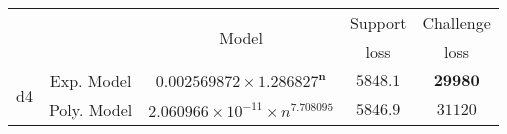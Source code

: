 \begin{tabular}{ccccc} 
\hline 
 &  & \multirow{2}{*}{Model} & Support & Challenge\tabularnewline 
 &  &  & loss  & loss\tabularnewline 
\hline 
\hline 
\multirow{2}{*}{d4} & Exp. Model & $\mathbf{0.002569872\times 1.286827^{n}}$ & $\mathbf{5848.1}$ & $\mathbf{29980}$ \tabularnewline 
 & Poly. Model & $2.060966\times10^{-11}\times n^{7.708095}$ & $5846.9$ & $31120$ \tabularnewline 
\hline 
\end{tabular} 

